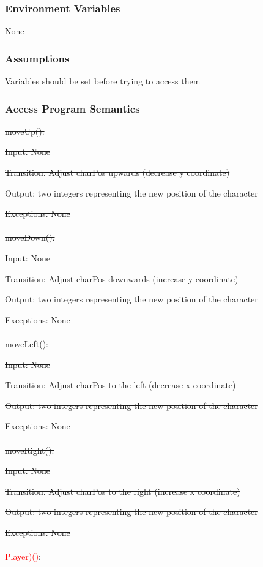 \documentclass[12pt, titlepage]{article}
\begin{document}
		\subsubsection{Environment Variables}
		None
		\subsubsection{Assumptions}
		Variables should be set before trying to access them
		
		\subsubsection{Access Program Semantics}
		\sout{moveUp():}
		
		\sout{Input: None}
		
		\sout{Transition: Adjust charPos upwards (decrease y coordinate) }
		
		\sout{Output: two integers representing the new position of the character}
		
		\sout{Exceptions: None}\\
		\\
		\sout{moveDown():}
		
		\sout{Input: None}
		
		\sout{Transition: Adjust charPos downwards (increase y coordinate)}
		
		\sout{Output: two integers representing the new position of the character}
		
		\sout{Exceptions: None}\\
		\\
		\sout{moveLeft():}
		
		\sout{Input: None}
		
		\sout{Transition: Adjust charPos to the left (decrease x coordinate)}
		
		\sout{Output: two integers representing the new position of the character}
		
		\sout{Exceptions: None}\\
		\\
		\sout{moveRight():}
		
		\sout{Input: None}
		
		\sout{Transition: Adjust charPos to the right (increase x coordinate) }
		
		\sout{Output: two integers representing the new position of the character}
		
		\sout{Exceptions: None}\\
		\\
		\textcolor{red}{Player)()}:
		
\end{document}
